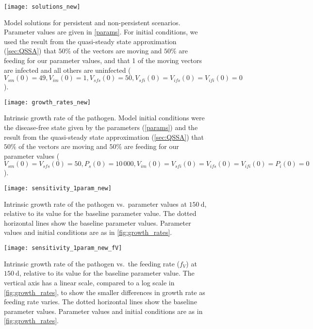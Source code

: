 \documentclass{article}
\begin{document}
\begin{figure}
  \centering
  \texttt{[image: solutions\_new]}
  \caption{Model solutions for persistent and non-persistent
    scenarios.  Parameter values are given in \autoref{params}.
    For initial conditions, we used the result from the quasi-steady
    state approximation (\autoref{sec:QSSA}) that $50\%$ of the
    vectors are moving and $50\%$ are feeding for our parameter
    values, and that 1 of the moving vectors are infected and all
    others are uninfected ($V_{sm}(0) = 49, V_{im}(0) = 1, V_{sfs}(0) =
    50, V_{sfi}(0) = V_{ifs}(0) = V_{ifi}(0) = 0$).}
  \label{fig:solutions}
\end{figure}

\begin{figure}
  \centering
  \texttt{[image: growth\_rates\_new]}
  \caption{Intrinsic growth rate of the pathogen.  Model initial
    conditions were the disease-free state given by the parameters
    (\autoref{params}) and the result from the quasi-steady state
    approximation (\autoref{sec:QSSA}) that $50\%$ of the vectors are
    moving and $50\%$ are feeding for our parameter values ($V_{sm}(0)
    = V_{sfs}(0) = 50, P_s(0) = 10\,000, V_{im}(0) = V_{sfi}(0) =
    V_{ifs}(0) = V_{ifi}(0) = P_i(0) = 0$).}
  \label{fig:growth_rates}
\end{figure}

\begin{figure}
  \centering
  \texttt{[image: sensitivity\_1param\_new]}
  \caption{Intrinsic growth rate of the pathogen vs.~parameter values
    at $150~\text{d}$, relative to its value for the baseline
    parameter value.  The dotted horizontal lines show the baseline
    parameter values.  Parameter values and initial conditions are as
    in \autoref{fig:growth_rates}.}
  \label{fig:sensitivity_1param}
\end{figure}

\begin{figure}
  \centering
  \texttt{[image: sensitivity\_1param\_new\_fV]}
  \caption{Intrinsic growth rate of the pathogen vs.~the feeding rate
    ($f_V$) at $150~\text{d}$, relative to its value for the baseline
    parameter value.  The vertical axis has a linear scale, compared
    to a log scale in \autoref{fig:growth_rates}, to show the smaller
    differences in growth rate as feeding rate varies.  The dotted
    horizontal lines show the baseline parameter values.  Parameter
    values and initial conditions are as in
    \autoref{fig:growth_rates}.}
  \label{fig:sensitivity_1param_fV}
\end{figure}
\end{document}
